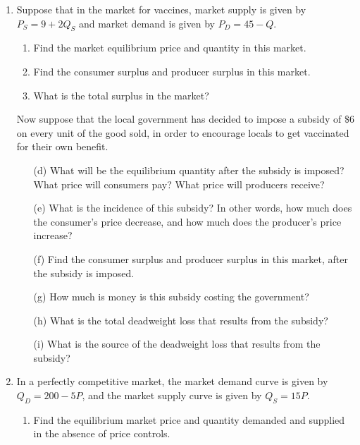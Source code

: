 \documentclass[11pt]{article}
\begin{document}
\begin{enumerate}
  \item Suppose that in the market for vaccines, market supply is given by $P_{S} = 9 + 2Q_{S}$ and market demand is given by $P_{D}= 45 - Q$. 
  \begin{enumerate}
    \item Find the market equilibrium price and quantity in this market.

    \item Find the consumer surplus and producer surplus in this market.

    \item What is the total surplus in the market?
  \end{enumerate}

  Now suppose that the local government has decided to impose a subsidy of $\$ 6$ on every unit of the good sold, in order to encourage locals to get vaccinated for their own benefit.
  
  \begin{enumerate}
    \item[(d)] What will be the equilibrium quantity after the subsidy is imposed? What price will consumers pay? What price will producers receive?

    \item[(e)] What is the incidence of this subsidy? In other words, how much does the consumer's price decrease, and how much does the producer's price increase?

    \item[(f)] Find the consumer surplus and producer surplus in this market, after the subsidy is imposed.

    \item[(g)] How much is money is this subsidy costing the government?

    \item[(h)] What is the total deadweight loss that results from the subsidy?

    \item[(i)] What is the source of the deadweight loss that results from the subsidy?
  \end{enumerate}

  \item In a perfectly competitive market, the market demand curve is given by $Q_D = 200 - 5P$, and the market supply curve is given by $Q_S = 15P$.

  \begin{enumerate}
    \item Find the equilibrium market price and quantity demanded and supplied in the absence of price controls.
    

\end{enumerate}
\end{enumerate}
\end{document}
